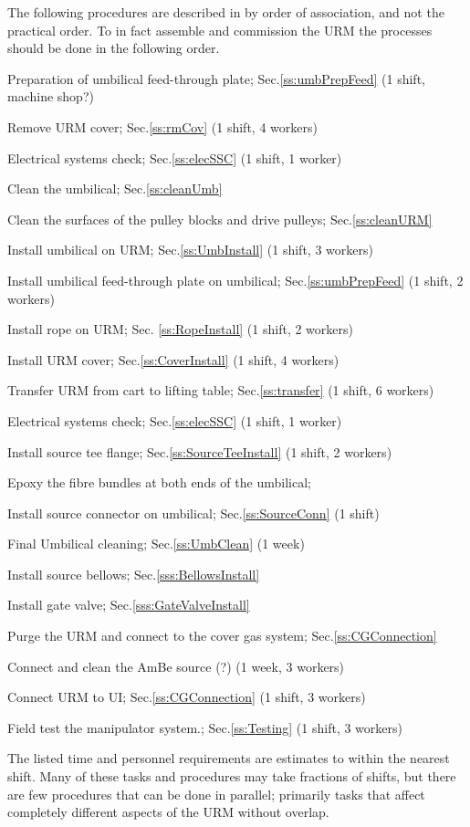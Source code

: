 \documentclass[11pt]{article}
\begin{document}
The following procedures are described in by order of association, and not the practical order. To in fact assemble and commission the URM the processes should be done in the following order. 
\begin{answerlist}
\item Preparation of umbilical feed-through plate; Sec.\ref{ss:umbPrepFeed} (1 shift, machine shop?)
\item Remove URM cover; Sec.\ref{ss:rmCov} (1 shift, 4 workers)
\item Electrical systems check; Sec.\ref{ss:elecSSC} (1 shift, 1 worker)
\item Clean the umbilical; Sec.\ref{ss:cleanUmb}
\item Clean the surfaces of the pulley blocks and drive pulleys; Sec.\ref{ss:cleanURM}
\item Install umbilical on URM; Sec.\ref{ss:UmbInstall} (1 shift, 3 workers)
\item Install umbilical feed-through plate on umbilical; Sec.\ref{ss:umbPrepFeed} (1 shift, 2 workers)
\item Install rope on URM; Sec. \ref{ss:RopeInstall} (1 shift, 2 workers)
\item Install URM cover; Sec.\ref{ss:CoverInstall} (1 shift, 4 workers)
\item Transfer URM from cart to lifting table; Sec.\ref{ss:transfer} (1 shift, 6 workers)
\item Electrical systems check; Sec.\ref{ss:elecSSC} (1 shift, 1 worker)
\item Install source tee flange; Sec.\ref{ss:SourceTeeInstall} (1 shift, 2 workers)
\item Epoxy the fibre bundles at both ends of the umbilical;
\item Install source connector on umbilical; Sec.\ref{ss:SourceConn} (1 shift)
\item Final Umbilical cleaning; Sec.\ref{ss:UmbClean} (1 week)
\item Install source bellows; Sec.\ref{sss:BellowsInstall}
\item Install gate valve; Sec.\ref{sss:GateValveInstall}
\item Purge the URM and connect to the cover gas system; Sec.\ref{ss:CGConnection}
\item Connect and clean the AmBe source (?) (1 week, 3 workers)
\item Connect URM to UI; Sec.\ref{ss:CGConnection} (1 shift, 3 workers)
\item Field test the manipulator system.; Sec.\ref{ss:Testing} (1 shift, 3 workers)
\end{answerlist}
The listed time and personnel requirements are estimates to within the nearest shift. Many of these tasks and procedures may take fractions of shifts, but there are few procedures that can be done in parallel; primarily tasks that affect completely different aspects of the URM without overlap.
\end{document}
